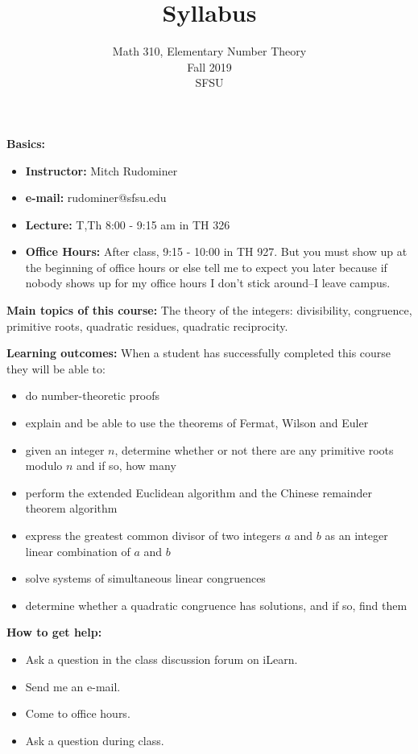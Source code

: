 \documentclass[oneside,12pt]{amsart}
\begin{document}
\title{Syllabus}
\author{Math 310, Elementary Number Theory  \\ Fall 2019 \\ SFSU }
\date{}

\maketitle

\textbf{Basics:}
\begin{itemize}
\item \textbf{Instructor:} Mitch Rudominer
\item \textbf{e-mail:} rudominer@sfsu.edu
\item \textbf{Lecture:}  T,Th 8:00 - 9:15 am in TH 326
\item \textbf{Office Hours:} After class, 9:15 - 10:00 in TH 927. But you must show up at the beginning of office hours or else tell me to expect you later because if nobody shows up for my office hours I don't stick around--I leave campus.
\end{itemize}

\bigskip

\textbf{Main topics of this course:}
The theory of the integers: divisibility, congruence,
primitive roots, quadratic residues, quadratic reciprocity.


\bigskip

\textbf{Learning outcomes:}
When a student has successfully completed this course they will be able to:
\begin{itemize}
\item do number-theoretic proofs
\item explain and be able to use the theorems of Fermat, Wilson and Euler
\item given an integer $n$, determine whether or not there are any primitive
roots modulo $n$ and if so, how many
\item perform the extended Euclidean algorithm and the Chinese remainder theorem algorithm
\item express the greatest common divisor of two integers $a$ and $b$ as an integer
linear combination of $a$ and $b$
\item solve systems of simultaneous linear congruences
\item determine  whether  a  quadratic congruence has solutions, and if so, find them
\end{itemize}

\bigskip

\textbf{How to get help:}
\begin{itemize}
\item Ask a question in the class discussion forum on iLearn.
\item Send me an e-mail.
\item Come to office hours.
\item Ask a question during class.
\end{itemize}
\end{document}
